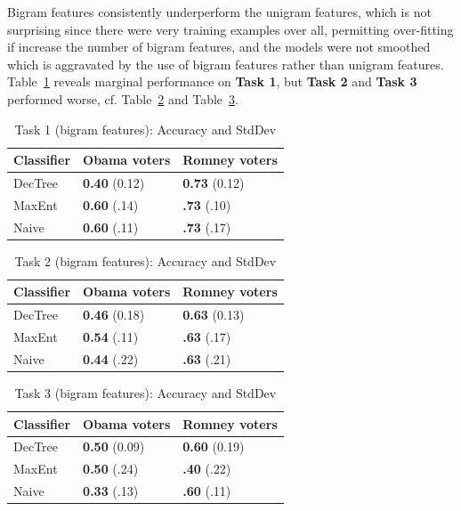 Bigram features consistently underperform the unigram features, which is not surprising since there were very training examples over all, permitting over-fitting if increase the number of bigram features, and the models were not smoothed which is aggravated by the use of bigram features rather than unigram features.  Table~\ref{tab:task1bigrams} reveals marginal performance on \textbf{Task 1}, but \textbf{Task 2} and \textbf{Task 3} performed worse, cf. Table~\ref{tab:task2bigrams} and Table~\ref{tab:task3bigrams}.

\begin{table}[H]
\begin{centering}
\begin{tabular}{ l | l | l }
Classifier & Obama voters & Romney voters \\
\hline
DecTree & \textbf{0.40} (0.12) &  \textbf{0.73} (0.12) \\
MaxEnt & \textbf{0.60} (.14) &  \textbf{.73} (.10) \\
Naive & \textbf{0.60} (.11) &  \textbf{.73} (.17) \\
\end{tabular}
\caption{Task 1 (bigram features): Accuracy and StdDev}
\label{tab:task1bigrams}
\end{centering}
\end{table}

\begin{table}[H]
\begin{centering}
\begin{tabular}{ l | l | l }
Classifier & Obama voters & Romney voters \\
\hline
DecTree & \textbf{0.46} (0.18) &  \textbf{0.63} (0.13) \\
MaxEnt & \textbf{0.54} (.11) &  \textbf{.63} (.17) \\
Naive & \textbf{0.44} (.22) &  \textbf{.63} (.21) \\
\end{tabular}
\caption{Task 2 (bigram features): Accuracy and StdDev}
\label{tab:task2bigrams}
\end{centering}
\end{table}

\begin{table}[H]
\begin{centering}
\begin{tabular}{ l | l | l }
Classifier & Obama voters & Romney voters \\
\hline
DecTree & \textbf{0.50} (0.09) &  \textbf{0.60} (0.19) \\
MaxEnt & \textbf{0.50} (.24) &  \textbf{.40} (.22) \\
Naive & \textbf{0.33} (.13) &  \textbf{.60} (.11) \\
\end{tabular}
\caption{Task 3 (bigram features): Accuracy and StdDev}
\label{tab:task3bigrams}
\end{centering}
\end{table}